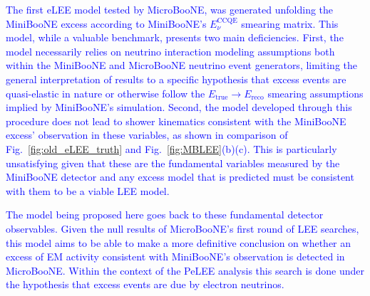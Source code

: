 \textcolor{blue}{The first eLEE model tested by MicroBooNE, was generated unfolding the MiniBooNE excess according to MiniBooNE's $E_{\nu}^{\textrm{CCQE}}$ smearing matrix. This model, while a valuable benchmark, presents two main deficiencies. First, the model necessarily relies on neutrino interaction modeling assumptions both within the MiniBooNE and MicroBooNE neutrino event generators, limiting the general interpretation of results to a specific hypothesis that excess events are quasi-elastic in nature or otherwise follow the $E_{\textrm{true}} \rightarrow E_{\textrm{reco}}$ smearing assumptions implied by MiniBooNE's simulation. Second, the model developed through this procedure does not lead to shower kinematics consistent with the MiniBooNE excess' observation in these variables, as shown in comparison of Fig.~\ref{fig:old_eLEE_truth} and Fig.~\ref{fig:MBLEE}(b)(c). This is particularly unsatisfying given that these are the fundamental variables measured by the MiniBooNE detector and any excess model that is predicted must be consistent with them to be a viable LEE model.}

\textcolor{blue}{The model being proposed here goes back to these fundamental detector observables. Given the null results of  MicroBooNE's first round of LEE searches, this model aims to be able to make a more definitive conclusion on whether an excess of EM activity consistent with MiniBooNE's observation is detected in MicroBooNE. Within the context of the PeLEE analysis this search is done under the hypothesis that excess events are due by electron neutrinos.}


